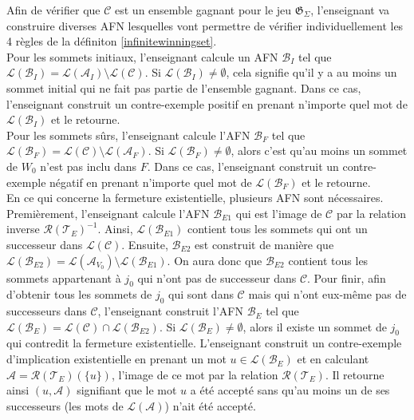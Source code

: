\documentclass[12pt,a4paper,oneside,titlepage]{report}
\begin{document}
Afin de vérifier que $\mathcal{C}$ est un ensemble gagnant pour le jeu $\mathfrak{G}_\Sigma$, l'enseignant va construire diverses AFN lesquelles vont permettre de vérifier individuellement les 4 règles de la définiton \ref{infinitewinningset}.\\

Pour les sommets initiaux, l'enseignant calcule un AFN $\mathcal{B}_I$ tel que $\mathcal{L}(\mathcal{B}_I)=\mathcal{L}(\mathcal{A}_I)\setminus\mathcal{L}(\mathcal{C})$. Si $\mathcal{L}(\mathcal{B}_I)\neq\emptyset$, cela signifie qu'il y a au moins un sommet initial qui ne fait pas partie de l'ensemble gagnant. Dans ce cas, l'enseignant construit un contre-exemple positif en prenant n'importe quel mot de $\mathcal{L}(\mathcal{B}_I)$ et le retourne.\\
Pour les sommets sûrs, l'enseignant calcule l'AFN $\mathcal{B}_F$ tel que $\mathcal{L}(\mathcal{B}_F)=\mathcal{L}(\mathcal{C})\setminus\mathcal{L}(\mathcal{A}_F)$. Si $\mathcal{L}(\mathcal{B}_F)\neq\emptyset$, alors c'est qu'au moins un sommet de $W_0$ n'est pas inclu dans $F$. Dans ce cas, l'enseignant construit un contre-exemple négatif en prenant n'importe quel mot de $\mathcal{L}(\mathcal{B}_F)$ et le retourne.\\
En ce qui concerne la fermeture existentielle, plusieurs AFN sont nécessaires. Premièrement, l'enseignant calcule l'AFN $\mathcal{B}_{E1}$ qui est l'image de $\mathcal{C}$ par la relation inverse $\mathcal{R}(\mathcal{T}_E)^{-1}$. Ainsi, $\mathcal{L}(\mathcal{B}_{E1})$ contient tous les sommets qui ont un successeur dans $\mathcal{L}(\mathcal{C})$. Ensuite, $\mathcal{B}_{E2}$ est construit de manière que $\mathcal{L}(\mathcal{B}_{E2})=\mathcal{L}(\mathcal{A}_{V_0})\setminus\mathcal{L}(\mathcal{B}_{E1})$. On aura donc que $\mathcal{B}_{E2}$ contient tous les sommets appartenant à $j_0$ qui n'ont pas de successeur dans $\mathcal{C}$. Pour finir, afin d'obtenir tous les sommets de $j_0$ qui sont dans $\mathcal{C}$ mais qui n'ont eux-même pas de successeurs dans $\mathcal{C}$, l'enseignant construit l'AFN $\mathcal{B}_E$ tel que $\mathcal{L}(\mathcal{B}_E)=\mathcal{L}(\mathcal{C})\cap\mathcal{L}(\mathcal{B}_{E2})$. Si $\mathcal{L}(\mathcal{B}_E)\neq\emptyset$, alors il existe un sommet de $j_0$ qui contredit la fermeture existentielle. L'enseignant construit un contre-exemple d'implication existentielle en prenant un mot $u\in\mathcal{L}(\mathcal{B}_E)$ et en calculant $\mathcal{A}=\mathcal{R}(\mathcal{T}_E)(\{u\})$, l'image de ce mot par la relation $\mathcal{R}(\mathcal{T}_E)$. Il retourne ainsi $(u,\mathcal{A})$ signifiant que le mot $u$ a été accepté sans qu'au moins un de ses successeurs (les mots de $\mathcal{L}(\mathcal{A})$) n'ait été accepté.\\
\end{document}
